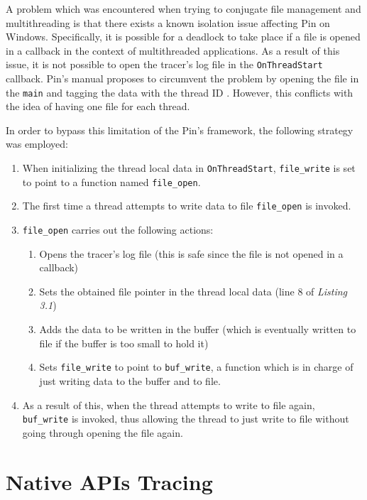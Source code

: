 A problem which was encountered when trying to conjugate file management and multithreading is that there exists a known isolation issue affecting Pin on Windows. Specifically, it is possible for a deadlock to take place if a file is opened in a callback in the context of multithreaded applications. As a result of this issue, it is not possible to open the tracer's log file in the \texttt{OnThreadStart} callback. Pin's manual proposes to circumvent the problem by opening the file in the \texttt{main} and tagging the data with the thread ID \cite{Pin}. However, this conflicts with the idea of having one file for each thread.

In order to bypass this limitation of the Pin's framework, the following strategy was employed:
\begin{enumerate}
\item When initializing the thread local data in \texttt{OnThreadStart}, \texttt{file\_write} is set to point to a function named \texttt{file\_open}.
\item The first time a thread attempts to write data to file \texttt{file\_open} is invoked.
\item \texttt{file\_open} carries out the following actions:
\begin{enumerate}
\item Opens the tracer's log file (this is safe since the file is not opened in a callback)
\item Sets the obtained file pointer in the thread local data (line 8 of \textit{Listing 3.1})
\item Adds the data to be written in the buffer (which is eventually written to file if the buffer is too small to hold it)
\item Sets \texttt{file\_write} to point to \texttt{buf\_write}, a function which is in charge of just writing data to the buffer and to file.
\end{enumerate}
\item As a result of this, when the thread attempts to write to file again, \texttt{buf\_write} is invoked, thus allowing the thread to just write to file without going through opening the file again.   
\end{enumerate}   

\section{Native APIs Tracing}

